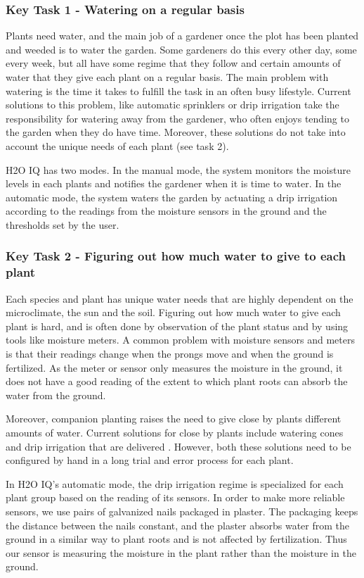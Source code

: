 \documentclass[11pt]{article}
\begin{document}
\subsubsection{Key Task 1 - Watering on a regular basis}
Plants need water, and the main job of a gardener once the plot has been planted and weeded is to water the garden. Some gardeners do this every other day, some every week, but all have some regime that they follow and certain amounts of water that they give each plant on a regular basis. The main problem with watering is the time it takes to fulfill the task in an often busy lifestyle. Current solutions to this problem, like automatic sprinklers or drip irrigation take the responsibility for watering away from the gardener, who often enjoys tending to the garden when they do have time. Moreover, these solutions do not take into account the unique needs of each plant (see task 2).

H2O IQ has two modes. In the manual mode, the system monitors the moisture levels in each plants and notifies the gardener when it is time to water. In the automatic mode, the system waters the garden by actuating a drip irrigation according to the readings from the moisture sensors in the ground and the thresholds set by the user.

\subsubsection{Key Task 2 - Figuring out how much water to give to each plant}

Each species and plant has unique water needs that are highly dependent on the microclimate, the sun and the soil. Figuring out how much water to give each plant is hard, and is often done by observation of the plant status and by using tools like moisture meters. A common problem with moisture sensors and meters is that their readings change when the prongs move and when the ground is fertilized. As the meter or sensor only measures the moisture in the ground, it does not have a good reading of the extent to which plant roots can absorb the water from the ground.

Moreover, companion planting raises the need to give close by plants different amounts of water. Current solutions for close by plants include watering cones and drip irrigation that are delivered . However, both these solutions need to be configured by hand in a long trial and error process for each plant.

In H2O IQ's automatic mode, the drip irrigation regime is specialized for each plant group based on the reading of its sensors. In order to make more reliable sensors, we use pairs of galvanized nails packaged in plaster. The packaging keeps the distance between the nails constant, and the plaster absorbs water from the ground in a similar way to plant roots and is not affected by fertilization. Thus our sensor is measuring the moisture in the plant rather than the moisture in the ground.
\end{document}
